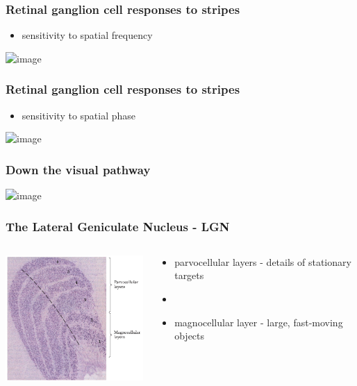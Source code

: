 \documentclass[]{beamer}
\begin{document}
\begin{frame}
 \frametitle{Retinal ganglion cell responses to stripes}
\begin{itemize}
 \item sensitivity to spatial frequency
\end{itemize}

\begin{center}
\includegraphics<1>[width=80mm]{figs/l3/lgn_gratings.png}
\end{center}
\end{frame}


\begin{frame}
 \frametitle{Retinal ganglion cell responses to stripes}
\begin{itemize}
 \item sensitivity to spatial phase
\end{itemize}

\begin{center}
\includegraphics<1>[width=80mm]{figs/l3/lgn_phase.png}
\end{center}
\end{frame}


\begin{frame}
 \frametitle{Down the visual pathway}
\begin{center}
\includegraphics<1>[width=80mm]{figs/l3/cortical_pathways2.png}
\end{center}
\end{frame}



\begin{frame}
 \frametitle{The Lateral Geniculate Nucleus - LGN}
\begin{overlayarea}{113mm}{69mm}
\begin{columns}[T]
 \begin{column}{50mm}
\includegraphics[width=60mm]{figs/l3/lgn_layers.png}
 \end{column}

 \begin{column}{60mm}
\begin{itemize}
 \setlength{\itemsep}{5pt}
 \item parvocellular layers - details of stationary targets
 \item[]
 \item magnocellular layer - large, fast-moving objects
\end{itemize}
 \end{column}
\end{columns}
\end{overlayarea}
\end{frame}
\end{document}
